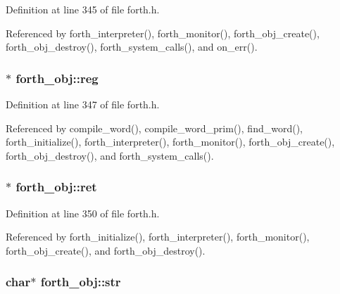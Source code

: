 Definition at line 345 of file forth.\-h.



Referenced by forth\-\_\-interpreter(), forth\-\_\-monitor(), forth\-\_\-obj\-\_\-create(), forth\-\_\-obj\-\_\-destroy(), forth\-\_\-system\-\_\-calls(), and on\-\_\-err().

\hypertarget{structforth__obj_aec82f9aa14ed1b88f71ca04ea1027dfa}{
\subsubsection[{reg}]{$\ast$ forth\-\_\-obj\-::reg}}\label{structforth__obj_aec82f9aa14ed1b88f71ca04ea1027dfa}


Definition at line 347 of file forth.\-h.



Referenced by compile\-\_\-word(), compile\-\_\-word\-\_\-prim(), find\-\_\-word(), forth\-\_\-initialize(), forth\-\_\-interpreter(), forth\-\_\-monitor(), forth\-\_\-obj\-\_\-create(), forth\-\_\-obj\-\_\-destroy(), and forth\-\_\-system\-\_\-calls().

\hypertarget{structforth__obj_a3fbef0ce707c544c528376b2c9788dbc}{
\subsubsection[{ret}]{$\ast$ forth\-\_\-obj\-::ret}}\label{structforth__obj_a3fbef0ce707c544c528376b2c9788dbc}


Definition at line 350 of file forth.\-h.



Referenced by forth\-\_\-initialize(), forth\-\_\-interpreter(), forth\-\_\-monitor(), forth\-\_\-obj\-\_\-create(), and forth\-\_\-obj\-\_\-destroy().

\hypertarget{structforth__obj_a7214c1e818fea38be42080ddf2d3406f}{
\subsubsection[{str}]{\setlength{\rightskip}{0pt plus 5cm}char$\ast$ forth\-\_\-obj\-::str}}\label{structforth__obj_a7214c1e818fea38be42080ddf2d3406f}


